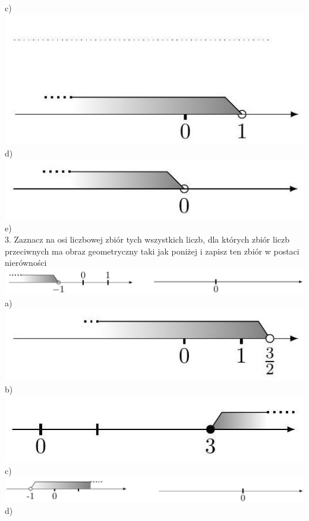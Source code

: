 \documentclass[10pt]{article}
\begin{document}
c)\\
\includegraphics[max width=\textwidth, center]{2024_11_21_8f01584889ff06348ae7g-164(3)}\\
d)\\
\includegraphics[max width=\textwidth, center]{2024_11_21_8f01584889ff06348ae7g-164(2)}\\
e)\\
3. Zaznacz na osi liczbowej zbiór tych wszystkich liczb, dla których zbiór liczb przeciwnych ma obraz geometryczny taki jak poniżej i zapisz ten zbiór w postaci nierówności\\
\includegraphics[max width=\textwidth, center]{2024_11_21_8f01584889ff06348ae7g-165(3)}\\
a)\\
\includegraphics[max width=\textwidth, center]{2024_11_21_8f01584889ff06348ae7g-165(2)}\\
b)\\
\includegraphics[max width=\textwidth, center]{2024_11_21_8f01584889ff06348ae7g-165}\\
c)\\
\includegraphics[max width=\textwidth, center]{2024_11_21_8f01584889ff06348ae7g-165(1)}\\
d)
\end{document}
